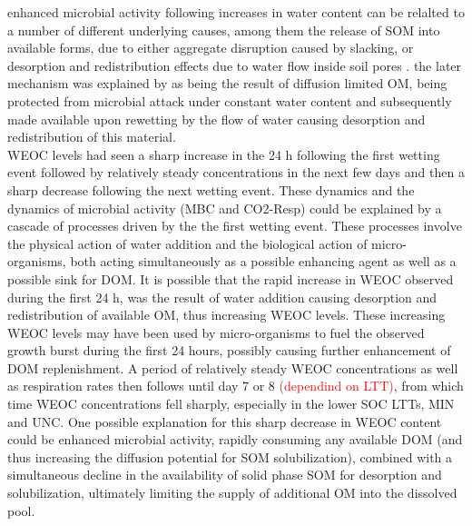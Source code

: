 \documentclass[12pt]{report}
\newcommand{\myRed}[1]{\textcolor{red}{#1}} %
\newcommand{\myGreen}[1]{\textcolor{olive}{#1}} %
\begin{document}
enhanced microbial activity following increases in water content can be relalted to a number of different underlying causes, among them the release of SOM into available forms, due to either aggregate disruption caused by slacking,  or desorption and redistribution effects due to water flow inside soil pores \citep{xiang2008}. the later mechanism was explained by \citeauthor{xiang2008} as being the result of diffusion limited OM, being protected from microbial attack under constant water content and subsequently made available upon rewetting by the flow of water causing desorption and redistribution of this material. \\
WEOC levels had seen a sharp increase in the 24 h following the first wetting event followed by relatively steady concentrations in the next few days and then a sharp decrease following the next wetting event. 
These  dynamics and the dynamics of microbial activity (MBC and CO2-Resp) could be explained by a cascade of processes driven by the the first wetting event. These processes involve the physical action of water addition and the biological action of micro-organisms, both acting simultaneously as a possible enhancing agent as well as a possible sink for DOM. It is possible that the rapid increase in WEOC observed during the first 24 h, was the result of water addition causing desorption and redistribution of available OM, thus increasing WEOC levels. These increasing WEOC levels may have been used by micro-organisms to fuel the observed growth burst during the first 24 hours, possibly causing further enhancement of DOM replenishment.  A period of relatively steady WEOC concentrations as well as respiration rates then follows until day 7 or 8 \myRed{(dependind on LTT)}, from which time WEOC concentrations fell sharply, especially in the lower SOC LTTs, MIN and UNC. 
One possible explanation for this sharp decrease in WEOC content could be enhanced microbial activity, rapidly consuming any available DOM (and thus increasing the diffusion potential for SOM solubilization), combined with a simultaneous decline in the availability of solid phase SOM for desorption and solubilization, ultimately limiting the supply of additional OM into the dissolved pool.
\end{document}
